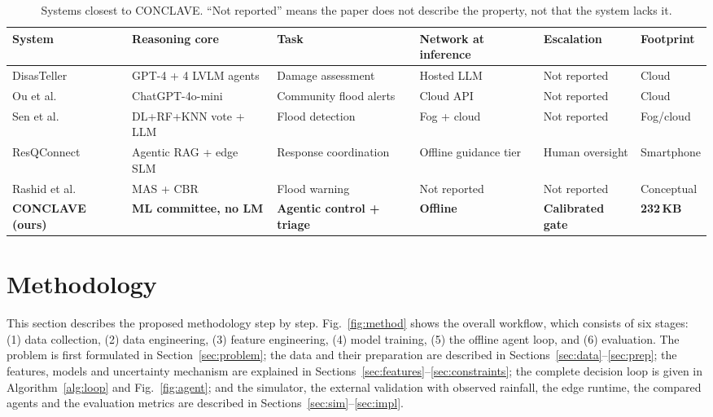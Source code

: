 \documentclass[journal]{IEEEtran}
\begin{document}
\begin{table}[t]
\centering
\caption{Systems closest to CONCLAVE. ``Not reported'' means the paper does not
describe the property, not that the system lacks it.}
\label{tab:related}
\footnotesize
\setlength{\tabcolsep}{4pt}
\begin{tabular}{llllll}
\toprule
System & Reasoning core & Task & Network at inference & Escalation & Footprint \\
\midrule
DisasTeller~\cite{chen2026integration} & GPT-4 + 4 LVLM agents & Damage assessment & Hosted LLM & Not reported & Cloud \\
Ou et al.~\cite{ou2025combination} & ChatGPT-4o-mini & Community flood alerts & Cloud API & Not reported & Cloud \\
Sen et al.~\cite{sen2026context} & DL+RF+KNN vote + LLM & Flood detection & Fog + cloud & Not reported & Fog/cloud \\
ResQConnect~\cite{aththanayake2026resqconnect} & Agentic RAG + edge SLM & Response coordination & Offline guidance tier & Human oversight & Smartphone \\
Rashid et al.~\cite{rashid2024integrating} & MAS + CBR & Flood warning & Not reported & Not reported & Conceptual \\
\midrule
\textbf{CONCLAVE (ours)} & \textbf{ML committee, no LM} & \textbf{Agentic control + triage} & \textbf{Offline} & \textbf{Calibrated gate} & \textbf{232\,KB} \\
\bottomrule
\end{tabular}
\end{table}

\section{Methodology}\label{sec:method}
This section describes the proposed methodology step by step. Fig.~\ref{fig:method}
shows the overall workflow, which consists of six stages: (1) data collection,
(2) data engineering, (3) feature engineering, (4) model training, (5) the
offline agent loop, and (6) evaluation. The problem is first formulated in
Section~\ref{sec:problem}; the data and their preparation are described in
Sections~\ref{sec:data}--\ref{sec:prep}; the features, models and uncertainty
mechanism are explained in Sections~\ref{sec:features}--\ref{sec:constraints};
the complete decision loop is given in Algorithm~\ref{alg:loop} and
Fig.~\ref{fig:agent}; and the simulator, the external validation with
observed rainfall, the edge runtime, the compared agents and the evaluation
metrics are described in Sections~\ref{sec:sim}--\ref{sec:impl}.
\end{document}
